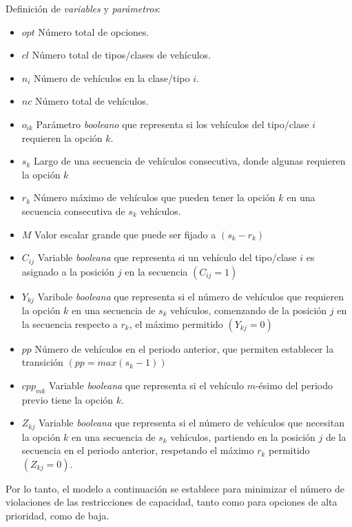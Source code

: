 Definición de \emph{variables} y \emph{parámetros}:
\begin{itemize}
	\item \textbf{$opt$}	    Número total de opciones.
	\item \textbf{$cl$}	    Número total de tipos/clases de vehículos.
	\item \textbf{$n_i$}    Número de vehículos en la clase/tipo $i$.
	\item \textbf{$nc$}	    Número total de vehículos.
	\item \textbf{$o_{ik}$}	Parámetro \emph{booleano} que representa si los vehículos del tipo/clase $i$ requieren la opción $k$.
	\item \textbf{$s_k$}    Largo de una secuencia de vehículos consecutiva, donde algunas requieren la opción $k$
	\item \textbf{$r_k$}    Número máximo de vehículos que pueden tener la opción $k$ en una secuencia consecutiva de $s_k$ vehículos.
	\item \textbf{$M$}	 	Valor escalar grande que puede ser fijado a $(s_{k} - r_{k})$
	\item \textbf{$C_{ij}$}	Variable \emph{booleana} que representa si un vehículo del tipo/clase $i$ es asignado a la posición $j$ en la secuencia
		$(C_{ij} = 1)$
	\item \textbf{$Y_{kj}$}	Varibale \emph{booleana} que representa si el número de vehículos que requieren la opción $k$ en una secuencia
		de $s_k$ vehículos, comenzando de la posición $j$ en la secuencia respecto a $r_k$, el máximo permitido $(Y_{kj} = 0)$
	\item \textbf{$pp$}	    Número de vehículos en el periodo anterior, que permiten establecer la transición $(pp = max(s_{k}-1))$
	\item \textbf{$cpp_{mk}$}	Variable \emph{booleana} que representa si el vehículo $m$-ésimo del periodo previo tiene la opción $k$.
	\item \textbf{$Z_{kj}$}	Variable \emph{booleana} que representa si el número de vehículos que necesitan la opción $k$ en una secuencia
		de $s_k$ vehículos, partiendo en la posición $j$ de la secuencia en el periodo anterior, respetando el máximo $r_k$ permitido $(Z_{kj} = 0)$.
\end{itemize}

Por lo tanto, el modelo a continuación se establece para minimizar el número de violaciones de las restricciones de capacidad,
tanto como para opciones de alta prioridad, como de baja.

